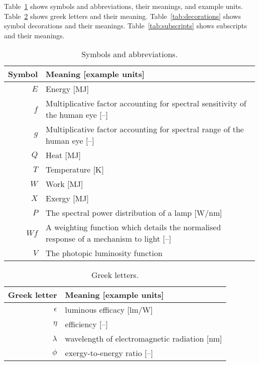 
\noindent 
Table~\ref{tab:symbols} shows symbols and abbreviations, their meanings, and example units.
Table~\ref{tab:greek} shows greek letters and their meaning.
Table~\ref{tab:decorations} shows symbol decorations and their meanings.
Table~\ref{tab:subscripts} shows subscripts and their meanings.


  
\begin{table}
\centering %
\caption{Symbols and abbreviations.}
\begin{tabular}{r l}
\toprule
Symbol & Meaning [example units] \\
\midrule
$E$ & Energy [MJ] \\
$f$ & Multiplicative factor accounting for spectral sensitivity of the human eye [--] \\
$g$ & Multiplicative factor accounting for spectral range of the human eye [--] \\
$Q$ & Heat [MJ] \\
$T$ & Temperature [K] \\
$W$ & Work [MJ] \\
$X$ & Exergy [MJ] \\
$P$ & The spectral power distribution of a lamp [W/nm] \\
$Wf$ & A weighting function which details the normalised response of a mechanism to light [--] \\
$V$ & The photopic luminosity function \\
\bottomrule
\end{tabular}
\label{tab:symbols}
\end{table}



\begin{table}
\centering %
\caption{Greek letters.}
\begin{tabular}{r l}
  \toprule
  Greek letter & Meaning [example units] \\
  \midrule
  $\epsilon$ & luminous efficacy [lm/W] \\
  $\eta$ & efficiency [--] \\
  $\lambda$ & wavelength of electromagnetic radiation [nm] \\
  $\phi$ & exergy-to-energy ratio [--] \\
  \bottomrule
\end{tabular}
\label{tab:greek}
\end{table}


